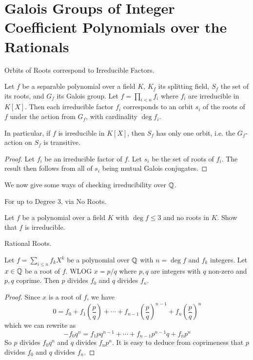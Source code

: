 \documentclass[../book.tex]{subfiles}
\begin{document}
\section{Galois Groups of Integer Coefficient Polynomials over the Rationals}

\begin{thm} Orbits of Roots correspond to Irreducible Factors.
    
    Let $f$ be a separable polynomial over a field $K$,
    $K_f$ its splitting field, $S_f$ the set of its roots, and $G_f$ its Galois group.
    Let $f = \prod_{i<n} f_i$ where $f_i$ are irreducible in $K[X]$.
    Then each irreducible factor $f_i$ corresponds 
    to an orbit $s_i$ of the roots of $f$ under the action from $G_f$,
    with cardinality $\deg f_i$. 
    
    In particular, if $f$ is irreducible in $K[X]$, 
    then $S_f$ has only one orbit,
    i.e. the $G_f$-action on $S_f$ is transitive.
    
\end{thm}
\begin{proof}
    
    Let $f_i$ be an irreducible factor of $f$. 
    Let $s_i$ be the set of roots of $f_i$.
    The result then follows from all of $s_i$ being mutual Galois conjugates. 
\end{proof}

We now give some ways of checking irreducibility over $\mathbb{Q}$.

\begin{ex} For up to Degree 3, via No Roots.
    
    Let $f$ be a polynomial over a field $K$
    with $\deg f \leq 3$ and no roots in $K$. 
    Show that $f$ is irreducible.
    
\end{ex}
\begin{thm} Rational Roots.
    
    Let $f = \sum_{i \leq n} f_k X^k$ be a polynomial over $\mathbb{Q}$ 
    with $n = \deg f$ and $f_k$ integers. 
    Let $x \in \mathbb{Q}$ be a root of $f$. 
    WLOG $x = p/q$ where $p, q$ are integers with $q$ non-zero and $p, q$ coprime. 
    Then $p$ divides $f_0$ and $q$ divides $f_{n}$. 
    
\end{thm}
\begin{proof}
    
    Since $x$ is a root of $f$, we have \[
        0 = f_0 + f_1 \left( \frac{p}{q} \right) + \cdots 
        + f_{n-1} \left( \frac{p}{q} \right)^{n-1}
        + f_n \left( \frac{p}{q} \right)^n
    \]
    which we can rewrite as    
    \[
        - f_0 q^{n} = f_1 p q^{n - 1} + \cdots 
        + f_{n - 1} p^{n - 1} q + f_{n} p^{n}
    \]
    So $p$ divides $f_0 q^n$ and $q$ divides $f_n p^n$. 
    It is easy to deduce from coprimeness that 
    $p$ divides $f_0$ and $q$ divides $f_n$.
    
\end{proof}
\end{document}
